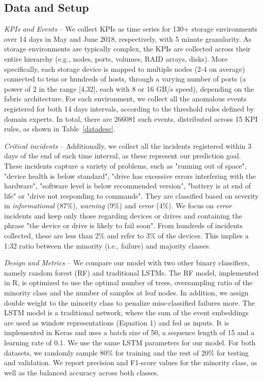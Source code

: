 \documentclass[letterpaper]{article} %
\begin{document}
\subsection{Data and Setup}
\textit{KPIs and Events} -- We collect KPIs as time series for 130+ storage environments over 14 days in May and June 2018, respectively, with 5 minute granularity. As storage environments are typically complex, the KPIs are collected across their entire hierarchy (e.g., nodes, ports, volumes, RAID arrays, disks). More specifically, each storage device is mapped to multiple nodes (2-4 on average) connected to tens or hundreds of hosts, through a varying number of ports (a power of 2 in the range [4,32], each with 8 or 16 GB/s speed), depending on the fabric architecture. For each environment, we collect all the anomalous events registered for both 14 days intervals, according to the threshold rules defined by domain experts. In total, there are 266081 such events, distributed across 15 KPI rules, as shown in Table~\ref{datadesc}.

\textit{Critical incidents} -- Additionally, we collect all the incidents registered within 3 days of the end of each time interval, as these represent our prediction goal. These incidents capture a variety of problems, such as "running out of space", "device health is below standard", "drive has excessive errors interfering with the hardware", "software level is below recommended version", "battery is at end of life" or "drive not responding to commands". They are classified based on severity in \textit{informational} (87\%), \textit{warning} (9\%) and \textit{error} (4\%). We focus on \textit{error} incidents and keep only those regarding devices or drives and containing the phrase "the device or drive is likely to fail soon". From hundreds of incidents collected, these are less than 2\% and refer to 3\% of the devices. This implies a 1:32 ratio between the minority (i.e., failure) and majority classes.

\textit{Design and Metrics} -- We compare our model with two other binary classifiers, namely random forest (RF) and traditional LSTMs. The RF model, implemented in R, is optimized to use the optimal number of trees, oversampling ratio of the minority class and the number of samples at leaf nodes. In addition, we assign double weight to the minority class to penalize miss-classified failures more. The LSTM model is a traditional network, where the sum of the event embeddings are used as window representations (Equation 1) and fed as inputs. It is implemented in Keras and uses a batch size of 50, a sequence length of 15 and a learning rate of 0.1. We use the same LSTM parameters for our model. For both datasets, we randomly sample 80\% for training and the rest of 20\% for testing and validation. We report precision and F1-score values for the minority class, as well as the balanced accuracy across both classes.
\end{document}
